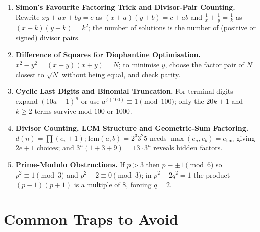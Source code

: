 \documentclass[11pt,a4paper]{article}
\begin{document}
\begin{enumerate}[leftmargin=2em, itemsep=4pt]
  \item \textbf{Simon's Favourite Factoring Trick and Divisor-Pair Counting.}
        Rewrite $xy+ax+by=c$ as $(x+a)(y+b)=c+ab$ and $\frac1x+\frac1y=\frac1k$ as $(x-k)(y-k)=k^{2}$; the number of solutions is the number of (positive or signed) divisor pairs. 
  \item \textbf{Difference of Squares for Diophantine Optimisation.}
        $x^{2}-y^{2}=(x-y)(x+y)=N$; to minimise $y$, choose the factor pair of $N$ closest to $\sqrt N$ without being equal, and check parity. 
  \item \textbf{Cyclic Last Digits and Binomial Truncation.}
        For terminal digits expand $(10a\pm1)^{n}$ or use $a^{\phi(100)}\equiv1\pmod{100}$; only the $20k\pm1$ and $k\ge2$ terms survive mod $100$ or $1000$. 
  \item \textbf{Divisor Counting, LCM Structure and Geometric-Sum Factoring.}
        $d(n)=\prod(e_{i}+1)$; $\mathrm{lcm}(a,b)=2^{3}3^{2}5$ needs $\max(e_{a},e_{b})=e_{\mathrm{lcm}}$ giving $2e+1$ choices; and $3^{n}(1+3+9)=13\cdot3^{n}$ reveals hidden factors. 
  \item \textbf{Prime-Modulo Obstructions.}
        If $p>3$ then $p\equiv\pm1\pmod6$ so $p^{2}\equiv1\pmod3$ and $p^{2}+2\equiv0\pmod3$; in $p^{2}-2q^{2}=1$ the product $(p-1)(p+1)$ is a multiple of $8$, forcing $q=2$. 
\end{enumerate}

\section*{Common Traps to Avoid}
\end{document}

